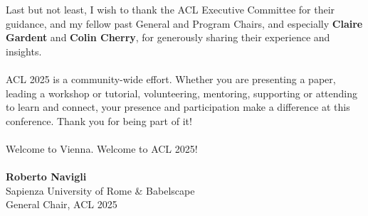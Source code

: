 Last but not least, I wish to thank the ACL Executive Committee for their guidance, and my fellow past General and Program Chairs, and especially \textbf{Claire Gardent} and \textbf{Colin Cherry}, for generously sharing their experience and insights.\\
\\

ACL 2025 is a community-wide effort. Whether you are presenting a paper, leading a workshop or tutorial, volunteering, mentoring, supporting or attending to learn and connect, your presence and participation make a difference at this conference. Thank you for being part of it!\\
\\

Welcome to Vienna. Welcome to ACL 2025!\\
\\
\textbf{Roberto Navigli}\\
Sapienza University of Rome & Babelscape\\
General Chair, ACL 2025\\
